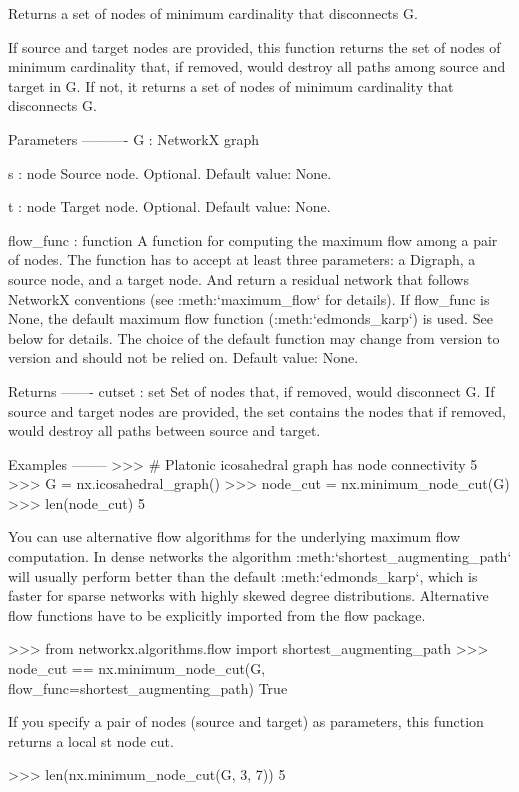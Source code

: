 \begin{DoxyVerb}Returns a set of nodes of minimum cardinality that disconnects G.

If source and target nodes are provided, this function returns the
set of nodes of minimum cardinality that, if removed, would destroy
all paths among source and target in G. If not, it returns a set
of nodes of minimum cardinality that disconnects G.

Parameters
----------
G : NetworkX graph

s : node
    Source node. Optional. Default value: None.

t : node
    Target node. Optional. Default value: None.

flow_func : function
    A function for computing the maximum flow among a pair of nodes.
    The function has to accept at least three parameters: a Digraph,
    a source node, and a target node. And return a residual network
    that follows NetworkX conventions (see :meth:`maximum_flow` for
    details). If flow_func is None, the default maximum flow function
    (:meth:`edmonds_karp`) is used. See below for details. The
    choice of the default function may change from version
    to version and should not be relied on. Default value: None.

Returns
-------
cutset : set
    Set of nodes that, if removed, would disconnect G. If source
    and target nodes are provided, the set contains the nodes that
    if removed, would destroy all paths between source and target.

Examples
--------
>>> # Platonic icosahedral graph has node connectivity 5
>>> G = nx.icosahedral_graph()
>>> node_cut = nx.minimum_node_cut(G)
>>> len(node_cut)
5

You can use alternative flow algorithms for the underlying maximum
flow computation. In dense networks the algorithm
:meth:`shortest_augmenting_path` will usually perform better
than the default :meth:`edmonds_karp`, which is faster for
sparse networks with highly skewed degree distributions. Alternative
flow functions have to be explicitly imported from the flow package.

>>> from networkx.algorithms.flow import shortest_augmenting_path
>>> node_cut == nx.minimum_node_cut(G, flow_func=shortest_augmenting_path)
True

If you specify a pair of nodes (source and target) as parameters,
this function returns a local st node cut.

>>> len(nx.minimum_node_cut(G, 3, 7))
5


\end{DoxyVerb}
